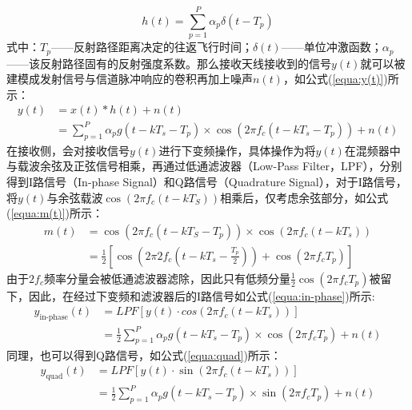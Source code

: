 \begin{equation}
    \label{equa:h(t)}
    h(t) = \sum_{p=1}^{P}\alpha_p \delta(t-T_p)
\end{equation}
式中：$T_p$——反射路径距离决定的往返飞行时间；$\delta(t)$——单位冲激函数；$\alpha_{p}$——该反射路径固有的反射强度系数。那么接收天线接收到的信号$y(t)$就可以被建模成发射信号与信道脉冲响应的卷积再加上噪声$n(t)$，如公式(\ref{equa:y(t)})所示：
\begin{equation}
    \label{equa:y(t)}
    \begin{aligned}
        y(t) &= x(t) * h(t) + n(t) \\
        &= \sum_{p=1}^P \alpha_p g(t - kT_s - T_p) \times \cos\left(2\pi f_c (t - kT_s - T_p)\right) + n(t)
    \end{aligned}
\end{equation}
在接收侧，会对接收信号$y(t)$进行下变频操作，具体操作为将$y(t)$在混频器中与载波余弦及正弦信号相乘，再通过低通滤波器（Low-Pass Filter，LPF），分别得到I路信号（In-phase Signal）和Q路信号（Quadrature Signal），对于I路信号，将$y(t)$与余弦载波$\cos(2\pi f_c(t-kT_S))$相乘后，仅考虑余弦部分，如公式(\ref{equa:m(t)})所示：
\begin{equation}
    \label{equa:m(t)}
    \begin{aligned}
        m(t) &= \cos(2\pi f_c (t - kT_S - T_p)) \times \cos(2\pi f_c (t - kT_s)) \\
             &= \frac{1}{2} \left[ \cos \left( 2\pi 2f_c \left( t - kT_s - \frac{T_p}{2} \right) \right) + \cos(2\pi f_c T_p) \right]
    \end{aligned}
\end{equation}
由于$2f_c$频率分量会被低通滤波器滤除，因此只有低频分量$\frac{1}{2}\cos(2\pi f_c T_p)$被留下，因此，在经过下变频和滤波器后的I路信号如公式(\ref{equa:in-phase})所示:
\begin{equation}
    \label{equa:in-phase}
    \begin{aligned}
        y_\text{in-phase}(t) &= LPF[y(t)\cdot cos(2\pi f_c(t-kT_s))] \\
                        &= \frac{1}{2}\sum_{p=1}^{P} \alpha_p g(t-kT_s-T_p)\times\cos(2\pi f_c T_p) +n(t)
    \end{aligned}
\end{equation}
同理，也可以得到Q路信号，如公式(\ref{equa:quad})所示：
\begin{equation}
    \label{equa:quad}
    \begin{aligned}
        y_\text{quad}(t) &= LPF[y(t)\cdot\sin(2\pi f_c(t-kT_s))] \\
                    &= \frac{1}{2}\sum_{p=1}^{P} \alpha_p g(t-kT_s-T_p) \times \sin(2\pi f_c T_p) + n(t)
    \end{aligned}
\end{equation}
